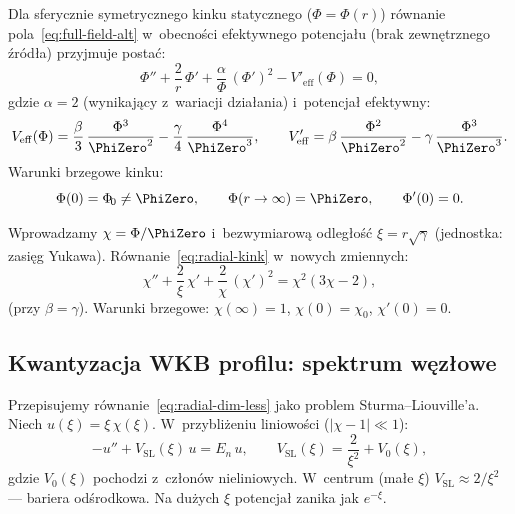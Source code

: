 Dla sferycznie symetrycznego kinku statycznego ($\Phi = \Phi(r)$)
r\'ownanie pola~\eqref{eq:full-field-alt} w~obecno\'sci
efektywnego potencja\l{}u (brak zewn\k{e}trznego \'zr\'od\l{}a)
przyjmuje posta\'c:
\begin{equation}\label{eq:radial-kink}
    \Phi'' + \frac{2}{r}\,\Phi'
    + \frac{\alpha}{\Phi}\,(\Phi')^2
    - V'_{\mathrm{eff}}(\Phi)
    = 0,
\end{equation}
gdzie $\alpha = 2$ (wynikaj\k{a}cy z~wariacji dzia\l{}ania)
i~potencja\l{} efektywny:
\begin{equation}\label{eq:Veff-kink}
    V_{\mathrm{eff}}(\Phi)
    = \frac{\beta}{3}\,\frac{\Phi^3}{\PhiZero^2}
    - \frac{\gamma}{4}\,\frac{\Phi^4}{\PhiZero^3},
    \qquad
    V'_{\mathrm{eff}}
    = \beta\,\frac{\Phi^2}{\PhiZero^2}
    - \gamma\,\frac{\Phi^3}{\PhiZero^3}.
\end{equation}
Warunki brzegowe kinku:
\begin{equation}\label{eq:kink-bc-radial}
    \Phi(0) = \Phi_{\!0} \neq \PhiZero,
    \qquad
    \Phi(r \to \infty) = \PhiZero,
    \qquad
    \Phi'(0) = 0.
\end{equation}

\begin{remark}%
\label{rem:phi-rescale}
Wprowadzamy $\chi = \Phi/\PhiZero$ i~bezwymiarow\k{a}
odleg\l{}o\'s\'c $\xi = r\sqrt{\gamma}$ (jednostka: zasi\k{e}g Yukawa).
R\'ownanie~\eqref{eq:radial-kink} w~nowych zmiennych:
\begin{equation}\label{eq:radial-dim-less}
    \chi'' + \frac{2}{\xi}\,\chi'
    + \frac{2}{\chi}\,(\chi')^2
    = \chi^2(3\chi - 2),
\end{equation}
(przy $\beta = \gamma$). Warunki brzegowe:
$\chi(\infty) = 1$, $\chi(0) = \chi_0$, $\chi'(0) = 0$.
\end{remark}

\subsection{Kwantyzacja WKB profilu: spektrum w\k{e}z\l{}owe}%
\label{app:F-wkb}

Przepisujemy r\'ownanie~\eqref{eq:radial-dim-less} jako
problem Sturma--Liouville'a. Niech $u(\xi) = \xi\,\chi(\xi)$.
W~przybli\.zeniu liniowo\'sci ($|\chi - 1| \ll 1$):
\begin{equation}\label{eq:sl-eq}
    -u'' + V_{\mathrm{SL}}(\xi)\,u = E_n\,u,
    \qquad
    V_{\mathrm{SL}}(\xi) = \frac{2}{\xi^2} + V_0(\xi),
\end{equation}
gdzie $V_0(\xi)$ pochodzi z~cz\l{}on\'ow nieliniowych.
W~centrum (ma\l{}e $\xi$) $V_{\mathrm{SL}} \approx 2/\xi^2$ ---
bariera odśrodkowa. Na du\.zych $\xi$ potencja\l{} zanika
jak $e^{-\xi}$.

